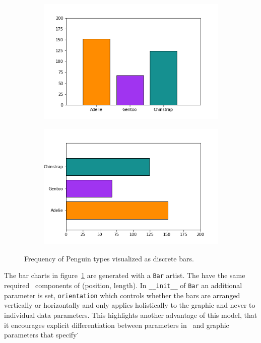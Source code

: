 \documentclass[../main.tex]{subfiles}
\begin{document}
\begin{figure}[H]
    \begin{subfigure}{0.5\textwidth}
        \includegraphics[width=\textwidth]{figures/code/bar_v.png}
    \end{subfigure}
    \begin{subfigure}{0.5\textwidth}
        \includegraphics[width=\textwidth]{figures/code/bar_h.png}
    \end{subfigure}
    \caption{Frequency of Penguin types visualized as discrete bars. }
    \label{fig:code_bar_simple}
\end{figure}
The bar charts in figure~\ref{fig:code_bar_simple} are generated with a \texttt{Bar} artist. The have the same required \vfiber\ components of (position, length). In \texttt{__init__} of \texttt{Bar} an additional parameter is set, \texttt{orientation} which controls whether the bars are arranged vertically or horizontally and only applies holistically to the graphic and never to individual data parameters. This highlights another advantage of this model, that it encourages explicit differentiation between parameters in \vtotal\ and graphic parameters that specify \vmarkd\. 
\end{document}
